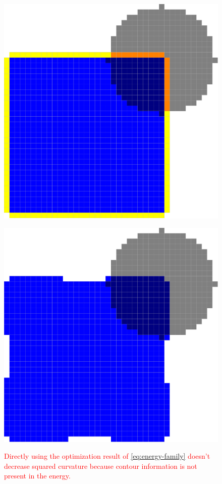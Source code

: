 \documentclass[smallextended]{svjour3}       %
\newcommand{\revision}[1]{\textcolor{red}{#1}}
\begin{document}
\begin{figure}
\begin{minipage}{0.5\textwidth}
\center
\includegraphics[scale=0.1]{flow_contour-information_before-opt.pdf}
\label{fig:contour-info-1}
\end{minipage}%
\begin{minipage}{0.5\textwidth}
\center
\includegraphics[scale=0.1]{flow_contour-information_after-opt.pdf}
\label{fig:contour-info-2}
\end{minipage}%
\caption{ \revision{Directly using the optimization result of \eqref{eq:energy-family} doesn't decrease squared curvature because contour information is not present in the energy.}}
\label{fig:contour-info}
\end{figure}
\end{document}
